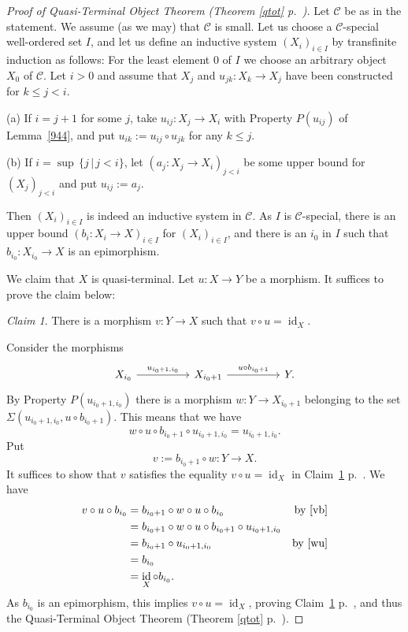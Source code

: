 \documentclass[12pt]{article}%
\theoremstyle{remark}
\newtheorem{claim}[thm]{Claim}
\theoremstyle{definition}
\newcommand{\nn}{\noindent}
\newcommand{\C}{\mathcal C}
\DeclareMathOperator{\id}{id}
\begin{document}
\begin{proof}[Proof of Quasi-Terminal Object Theorem (Theorem \ref{qtot} p.~\pageref{qtot})] 
Let $\C$ be as in the statement. We assume (as we may) that $\C$ is small. Let us choose a $\C$-special well-ordered set $I$, and let us define an inductive system $(X_i)_{i\in I}$ by transfinite induction as follows: For the least element $0$ of $I$ we choose an arbitrary object $X_0$ of $\C$. Let $i>0$ and assume that $X_j$ and $u_{jk}:X_k\to X_j$ have been constructed for $k\le j<i$. 

\nn(a) If $i=j+1$ for some $j$, take $u_{ij}:X_j\to X_i$ with Property $P(u_{ij})$ of Lemma~\ref{944}, and put $u_{ik}:=u_{ij}\circ u_{jk}$ for any $k\le j$.

\nn(b) If $i=\sup\,\{j\,|\,j<i\}$, let $(a_j:X_j\to X_i)_{j<i}$ be some upper bound for $(X_j)_{j<i}$ and put $u_{ij}:=a_j$. 

Then $(X_i)_{i\in I}$ is indeed an inductive system in $\C$. As $I$ is $\C$-special, there is an upper bound $(b_i:X_i\to X)_{i\in I}$ for $(X_i)_{i\in I}$, and there is an $i_0$ in $I$ such that $b_{i_0}:X_{i_0}\to X$ is an epimorphism. 

We claim that $X$ is quasi-terminal. Let $u:X\to Y$ be a morphism. It suffices to prove the claim below: 
\begin{claim}\label{cqt}
There is a morphism $v:Y\to X$ such that $v\circ u=\id_X$. 
\end{claim} 

Consider the morphisms 
$$
\begin{tikzcd}
X_{i_0}\ar{rr}{u_{i_0+1,i_0}}&&X_{i_0+1}\ar{rr}{u\circ b_{i_0+1}}&&Y.
\end{tikzcd}
$$
By Property $P(u_{i_0+1,i_0})$ there is a morphism $w:Y\to X_{i_0+1}$ belonging to the set $\Sigma(u_{i_0+1,i_0},u\circ b_{i_0+1})$. This means that we have 
%
\begin{equation}\label{wu}
w\circ u\circ b_{i_0+1}\circ u_{i_0+1,i_0}=u_{i_0+1,i_0}.
\end{equation} 
%
Put
%
\begin{equation}\label{vb}
v:=b_{i_0+1}\circ w:Y\to X.
\end{equation}
%
It suffices to show that $v$ satisfies the equality $v\circ u=\id_X$ in Claim~\ref{cqt} p.~\pageref{cqt}. We have 
%
\begin{align*}
v\circ u\circ b_{i_0}&=b_{i_0+1}\circ w\circ u\circ b_{i_0}&\text{by \eqref{vb}}\\ 
&=b_{i_0+1}\circ w\circ u\circ b_{i_0+1}\circ u_{i_0+1,i_0}\\ 
&=b_{i_0+1}\circ u_{i_0+1,i_0}&\text{by \eqref{wu}}\\ 
&=b_{i_0}\\ 
&=\id_X\circ b_{i_0}. 
\end{align*}
%
As $b_{i_0}$ is an epimorphism, this implies $v\circ u=\id_X$, proving Claim~\ref{cqt} p.~\pageref{cqt}, and thus the Quasi-Terminal Object Theorem (Theorem \ref{qtot} p.~\pageref{qtot}). 
\end{proof}
\end{document}
